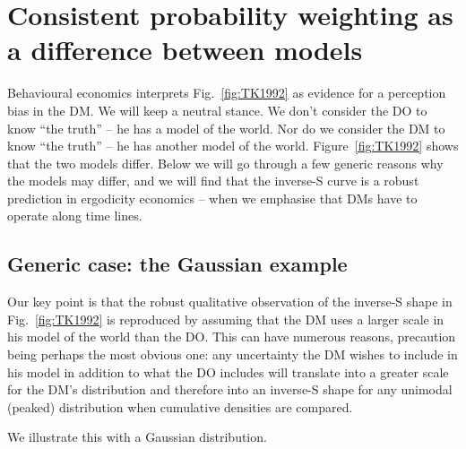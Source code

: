 \documentclass[11pt]{article}
\newcommand{\ie}{{\it i.e.}\xspace}
\newcommand{\fref}[1]{Fig.~\ref{fig:#1}}
\newcommand{\Fref}[1]{Figure~\ref{fig:#1}}
\numberwithin{equation}{section}
\begin{document}
\section{Consistent probability weighting as a difference between models}

Behavioural economics interprets \fref{TK1992} as evidence for a perception bias in the DM. We will keep a neutral stance. We don't consider the DO to know ``the truth'' -- he has a model of the world. Nor do we consider the DM to know ``the truth'' -- he has another model of the world. \Fref{TK1992} shows that the two models differ. Below we will go through a few generic reasons why the models may differ, and we will find that the inverse-S curve is a robust prediction in ergodicity economics -- when we emphasise that DMs have to operate along time lines.


\subsection{Generic case: the Gaussian example}
Our key point is that the robust qualitative observation of the inverse-S shape in \fref{TK1992} is reproduced by assuming that the DM uses a larger scale in his model of the world than the DO. This can have numerous reasons, precaution being perhaps the most obvious one: any uncertainty the DM wishes to include in his model in addition to what the DO includes will translate into a greater scale for the DM's distribution and therefore into an inverse-S shape for any unimodal (peaked) distribution when cumulative densities are compared.

We illustrate this with a Gaussian distribution.

%
%
\end{document}
